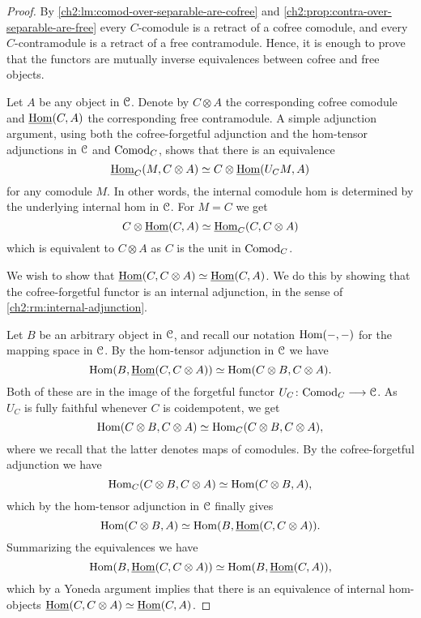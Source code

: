 \begin{proof}
    By \cref{ch2:lm:comod-over-separable-are-cofree} and \cref{ch2:prop:contra-over-separable-are-free} every $C$-comodule is a retract of a cofree comodule, and every $C$-contramodule is a retract of a free contramodule. Hence, it is enough to prove that the functors are mutually inverse equivalences between cofree and free objects.  
    
    Let $A$ be any object in $\EuScript{C}$. Denote by $C\otimes A$ the corresponding cofree comodule and $\operatorname{\underline{Hom}}(C, A)$ the corresponding free contramodule. A simple adjunction argument, using both the cofree-forgetful adjunction and the hom-tensor adjunctions in $\EuScript{C}$ and $\mathrm{Comod}_C$, shows that there is an equivalence 
    \[\operatorname{\underline{Hom}}_C(M, C\otimes A)\simeq C\otimes \operatorname{\underline{Hom}}(U_C M, A)\]
    for any comodule $M$. In other words, the internal comodule hom is determined by the underlying internal hom in $\EuScript{C}$. For $M = C$ we get
    \[C\otimes \operatorname{\underline{Hom}}(C, A)\simeq \operatorname{\underline{Hom}}_C(C, C\otimes A)\]
    which is equivalent to $C\otimes A$ as $C$ is the unit in $\mathrm{Comod}_C$. 

    We wish to show that $\operatorname{\underline{Hom}}(C, C\otimes A) \simeq \operatorname{\underline{Hom}}(C, A)$. We do this by showing that the cofree-forgetful functor is an internal adjunction, in the sense of \cref{ch2:rm:internal-adjunction}. 

    Let $B$ be an arbitrary object in $\EuScript{C}$, and recall our notation $\operatorname{Hom}(-,-)$ for the mapping space in $\EuScript{C}$. By the hom-tensor adjunction in $\EuScript{C}$ we have 
    \[\operatorname{Hom}(B, \operatorname{\underline{Hom}}(C, C\otimes A)) \simeq \operatorname{Hom}(C\otimes B, C\otimes A).\]
    Both of these are in the image of the forgetful functor $U_C\colon\mathrm{Comod}_C\longrightarrow \EuScript{C}$. As $U_C$ is fully faithful whenever $C$ is coidempotent, we get 
    \[\operatorname{Hom}(C\otimes B, C\otimes A) \simeq \operatorname{Hom}_C(C\otimes B, C\otimes A),\]
    where we recall that the latter denotes maps of comodules. By the cofree-forgetful adjunction we have 
    \[\operatorname{Hom}_C(C\otimes B, C\otimes A) \simeq \operatorname{Hom}(C\otimes B, A),\]
    which by the hom-tensor adjunction in $\EuScript{C}$ finally gives 
    \[\operatorname{Hom}(C\otimes B, A) \simeq \operatorname{Hom}(B, \operatorname{\underline{Hom}}(C, C\otimes A)).\]
    Summarizing the equivalences we have 
    \[\operatorname{Hom}(B, \operatorname{\underline{Hom}}(C, C\otimes A))\simeq \operatorname{Hom}(B, \operatorname{\underline{Hom}}(C, A)),\] 
    which by a Yoneda argument implies that there is an equivalence of internal hom-objects $\operatorname{\underline{Hom}}(C, C\otimes A)\simeq \operatorname{\underline{Hom}}(C, A)$. 



\end{proof}
